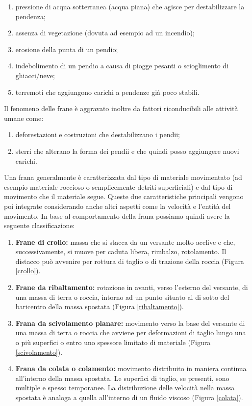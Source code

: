 \begin{enumerate}
	\item pressione di acqua sotterranea (acqua piana) che agisce per destabilizzare la pendenza;
	\item assenza di vegetazione (dovuta ad esempio ad un incendio);
	\item erosione della punta di un pendio;
	\item indebolimento di un pendio a causa di piogge pesanti o scioglimento di ghiacci/neve;
	\item terremoti che aggiungono carichi a pendenze già poco stabili.
\end{enumerate}
Il fenomeno delle frane è aggravato inoltre da fattori riconducibili alle attività umane come:
\begin{enumerate}
	\item deforestazioni e costruzioni che destabilizzano i pendii;
	\item sterri che alterano la forma dei pendii e che quindi posso aggiungere nuovi carichi.
\end{enumerate}
Una frana generalmente è caratterizzata dal tipo di materiale movimentato (ad esempio materiale roccioso o semplicemente detriti superficiali) e dal tipo di movimento che il materiale segue. Queste due caratteristiche principali vengono poi integrate considerando anche altri aspetti come la velocità e l'entità del movimento.
In base al comportamento della frana possiamo quindi avere la seguente classificazione: 
\begin{enumerate}
	\item \textbf{Frane di crollo:} massa che si stacca da un versante molto acclive e che, successivamente, si muove per caduta libera, rimbalzo, rotolamento. Il distacco può avvenire per rottura di taglio o di trazione della roccia (Figura \ref{crollo}).
	\item \textbf{Frane da ribaltamento:} rotazione in avanti, verso l'esterno del versante, di una massa di terra o roccia, intorno ad un punto situato al di sotto del baricentro della massa spostata (Figura \ref{ribaltamento}).
	\item \textbf{Frana da scivolamento planare:} movimento verso la base del versante di una massa di terra o roccia che avviene per deformazioni di taglio lungo una o più superfici o entro uno spessore limitato di materiale (Figura \ref{scivolamento}).
	\item \textbf{Frana da colata o colamento:} movimento distribuito in maniera continua all'interno della massa spostata. Le superfici di taglio, se presenti, sono multiple e spesso temporanee. La distribuzione delle velocità nella massa
	spostata è analoga a quella all'interno di un fluido viscoso  (Figura \ref{colata}).
\end{enumerate}

